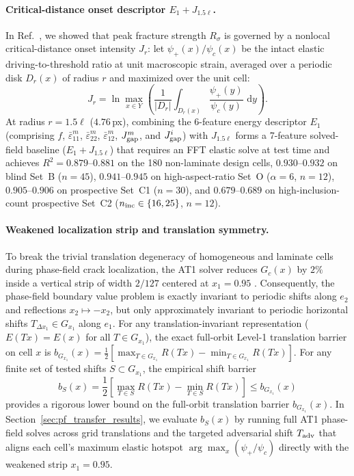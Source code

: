 \documentclass[preprint,11pt,a4paper]{elsarticle}
\newcommand{\dd}{\,\mathrm d}
\begin{document}
\paragraph{Critical-distance onset descriptor $E_1+J_{1.5\ell}$.}
In Ref.~\cite{GomezOvalle2026}, we showed that peak fracture strength $R_\sigma$ is governed by a nonlocal critical-distance onset intensity $J_r$: let $\psi_+(x)/\psi_c(x)$ be the intact elastic driving-to-threshold ratio at unit macroscopic strain, averaged over a periodic disk $D_r(x)$ of radius $r$ and maximized over the unit cell:
\begin{equation}
J_r = \ln\max_{x\in Y}\left(\frac{1}{|D_r|}\int_{D_r(x)}\frac{\psi_+(y)}{\psi_c(y)}\,\dd y\right).
\end{equation}
At radius $r=1.5\ell$ ($4.76$\,px), combining the 6-feature energy descriptor $E_1$ (comprising $f$, $\bar\varepsilon^m_{11}$, $\bar\varepsilon^m_{22}$, $\bar\varepsilon^m_{12}$, $J_{\rm gap}^m$, and $J_{\rm gap}^i$) with $J_{1.5\ell}$ forms a 7-feature solved-field baseline ($E_1+J_{1.5\ell}$) that requires an FFT elastic solve at test time and achieves $R^2=0.879\text{--}0.881$ on the 180 non-laminate design cells, $0.930\text{--}0.932$ on blind Set~B ($n=45$), $0.941\text{--}0.945$ on high-aspect-ratio Set~O ($\alpha=6$, $n=12$), $0.905\text{--}0.906$ on prospective Set~C1 ($n=30$), and $0.679\text{--}0.689$ on high-inclusion-count prospective Set~C2 ($n_{\rm inc}\in\{16,25\}$, $n=12$).

\paragraph{Weakened localization strip and translation symmetry.}
To break the trivial translation degeneracy of homogeneous and laminate cells during phase-field crack localization, the AT1 solver reduces $G_c(x)$ by $2\%$ inside a vertical strip of width $2/127$ centered at $x_1=0.95$ \cite{GomezOvalle2026}. Consequently, the phase-field boundary value problem is exactly invariant to periodic shifts along $e_2$ and reflections $x_2\mapsto -x_2$, but only approximately invariant to periodic horizontal shifts $T_{\Delta x_1}\in G_{x_1}$ along $e_1$. For any translation-invariant representation ($E(Tx)=E(x)$ for all $T\in G_{x_1}$), the exact full-orbit Level-1 translation barrier on cell $x$ is $b_{G_{x_1}}(x)=\frac12[\max_{T\in G_{x_1}}R(Tx)-\min_{T\in G_{x_1}}R(Tx)]$. For any finite set of tested shifts $S\subset G_{x_1}$, the empirical shift barrier
\begin{equation}
b_S(x) = \frac12\left[\max_{T\in S} R(Tx) - \min_{T\in S} R(Tx)\right] \le b_{G_{x_1}}(x)
\label{eq:b_shift}
\end{equation}
provides a rigorous lower bound on the full-orbit translation barrier $b_{G_{x_1}}(x)$. In Section~\ref{sec:pf_transfer_results}, we evaluate $b_S(x)$ by running full AT1 phase-field solves across grid translations and the targeted adversarial shift $T_{\rm adv}$ that aligns each cell's maximum elastic hotspot $\arg\max_x(\psi_+/\psi_c)$ directly with the weakened strip $x_1=0.95$.
\end{document}
